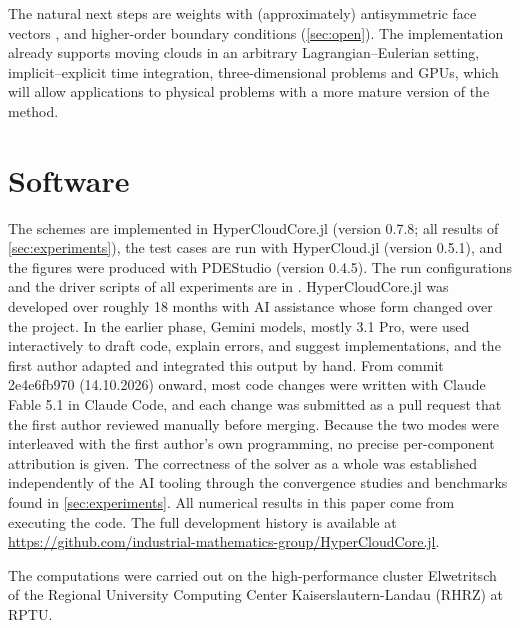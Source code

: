 \documentclass[smallextended]{svjour3}
\numberwithin{equation}{section}
\begin{document}
The natural next steps are weights with (approximately) antisymmetric face vectors \cite{Chiu2012,Suchde2017}, and higher-order boundary conditions (\cref{sec:open}). The implementation \cite{jung_hypercloudcore,jung_hypercloud} already supports moving clouds in an arbitrary Lagrangian--Eulerian setting, implicit--explicit time integration, three-dimensional problems and GPUs, which will allow applications to physical problems with a more mature version of the method.

\section*{Software}
The schemes are implemented in HyperCloudCore.jl \cite{jung_hypercloudcore} (version 0.7.8; all results of \cref{sec:experiments}), the test cases are run with HyperCloud.jl \cite{jung_hypercloud} (version 0.5.1), and the figures were produced with PDEStudio \cite{jung_pdestudio} (version 0.4.5). The run configurations and the driver scripts of all experiments are in \cite{jung_meshfree_simulations}.
HyperCloudCore.jl was developed over roughly 18 months with AI assistance whose form changed over the project. In the earlier phase, Gemini models, mostly 3.1 Pro, were used interactively to draft code, explain errors, and suggest implementations, and the first author adapted and integrated this output by hand. From commit 2e4e6fb970 (14.10.2026) onward, most code changes were written with Claude Fable 5.1 in Claude Code, and each change was submitted as a pull request that the first author reviewed manually before merging. Because the two modes were interleaved with the first author's own programming, no precise per-component attribution is given. The correctness of the solver as a whole was established independently of the AI tooling through the convergence studies and benchmarks found in \cref{sec:experiments}. All numerical results in this paper come from executing the code. The full development history is available at \url{https://github.com/industrial-mathematics-group/HyperCloudCore.jl}.

\begin{acknowledgements}
The computations were carried out on the high-performance cluster Elwetritsch of the Regional University Computing Center Kaiserslautern-Landau (RHRZ) at RPTU.
\end{acknowledgements}

\end{document}
